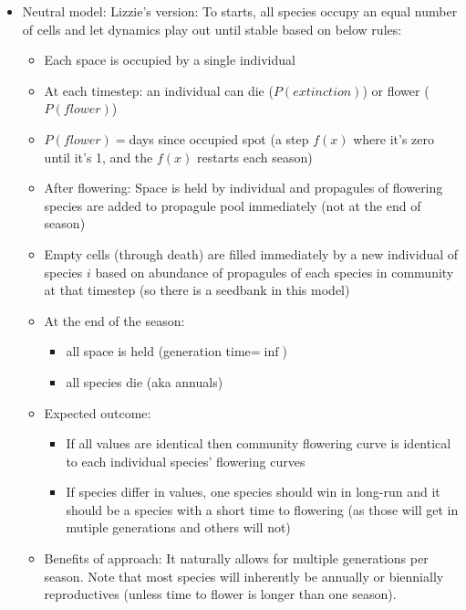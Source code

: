\documentclass[11pt,a4paper]{article}
\begin{document}
\begin{itemize}
\begin{itemize}
\end{itemize}
\item Neutral model: Lizzie's version: To starts, all species occupy an equal number of cells and let dynamics play out until stable based on below rules:
\begin{itemize}
\item Each space is occupied by a single individual
\item At each timestep: an individual can die ($P(extinction)$) or flower ($P(flower)$)
\item $P(flower)=$days since occupied spot (a step $f(x)$ where it's zero until it's 1, and the $f(x)$ restarts each season)
\item After flowering: Space is held by individual and propagules of flowering species are added to propagule pool immediately (not at the end of season)
\item Empty cells (through death) are filled immediately by a new individual of species $i$ based on abundance of propagules of each species in community at that timestep (so there is a seedbank in this model)
\item At the end of the season:
\begin{itemize}
\item all space is held (generation time=$\inf$)
\item all species die (aka annuals)
\end{itemize}
\item Expected outcome:
\begin{itemize}
\item If all values are identical then community flowering curve is identical to each individual species' flowering curves
\item If species differ in values, one species should win in long-run and it should be a species with a short time to flowering (as those will get in mutiple generations and others will not)
\end{itemize}
\item Benefits of approach: It naturally allows for multiple generations per season. Note that most species will inherently be annually or biennially reproductives (unless time to flower is longer than one season). 
\end{itemize}
\end{itemize}
\end{document}
